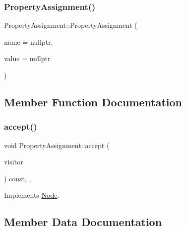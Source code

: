 \subsubsection{\texorpdfstring{Property\+Assignment()}{PropertyAssignment()}}
{\footnotesize\ttfamily Property\+Assignment\+::\+Property\+Assignment (\begin{DoxyParamCaption}\item[{\hyperlink{struct_property_name}{Property\+Name} $\ast$}]{name = {\ttfamily nullptr},  }\item[{\hyperlink{struct_expression}{Expression} $\ast$}]{value = {\ttfamily nullptr} }\end{DoxyParamCaption})\hspace{0.3cm}{\ttfamily [inline]}}



\subsection{Member Function Documentation}
\mbox{\label{struct_property_assignment_aaf11e7373f4d7863802c51548ce22317}} 
\subsubsection{\texorpdfstring{accept()}{accept()}}
{\footnotesize\ttfamily void Property\+Assignment\+::accept (\begin{DoxyParamCaption}\item[{\hyperlink{struct_visitor}{Visitor} \&}]{visitor }\end{DoxyParamCaption}) const\hspace{0.3cm}{\ttfamily [inline]}, {\ttfamily [override]}, {\ttfamily [virtual]}}



Implements \hyperlink{struct_node_a10bd7af968140bbf5fa461298a969c71}{Node}.



\subsection{Member Data Documentation}
\mbox{\label{struct_property_assignment_a7cb6c2f32adf600bb23564cfe6dc0463}} 
